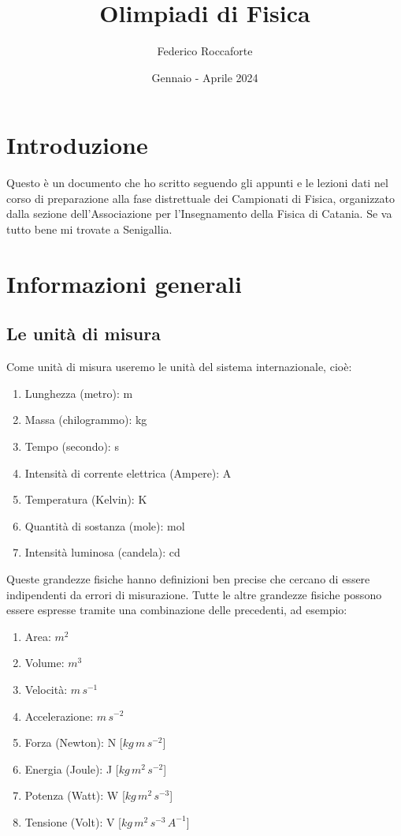 \documentclass{article}
\title{Olimpiadi di Fisica}
\author{Federico Roccaforte}
\date{Gennaio - Aprile 2024}
\begin{document}
\maketitle

\section*{Introduzione} 
Questo è un documento che ho scritto seguendo gli appunti e le lezioni dati nel corso di preparazione alla fase distrettuale dei Campionati di Fisica, organizzato dalla sezione dell'Associazione per l'Insegnamento della Fisica di Catania. Se va tutto bene mi trovate a Senigallia.

\tableofcontents

\section{Informazioni generali}
\subsection{Le unità di misura}
Come unità di misura useremo le unità del sistema internazionale, cioè:
\begin{enumerate}
    \item Lunghezza (metro):  m
    \item Massa (chilogrammo):  kg
    \item Tempo (secondo):  s
    \item Intensità di corrente elettrica (Ampere):  A
    \item Temperatura (Kelvin):  K
    \item Quantità di sostanza (mole):  mol
    \item Intensità luminosa (candela):  cd
\end{enumerate}
Queste grandezze fisiche hanno definizioni ben precise che cercano di essere indipendenti da errori di misurazione.
Tutte le altre grandezze fisiche possono essere espresse tramite una combinazione delle precedenti, ad esempio:
\begin{enumerate}
    \item Area:  $m^2$
    \item Volume: $m^3$
    \item Velocità: $m\,s^{-1}$
    \item Accelerazione: $m\,s^{-2}$
    \item Forza (Newton): N [$kg\,m\,s^{-2}$] 
    \item Energia (Joule): J [$kg\,m^2\,s^{-2}$] 
    \item Potenza (Watt): W [$kg\,m^2\,s^{-3}$] 
    \item Tensione (Volt): V [$kg\,m^2\,s^{-3}\,A^{-1}$] 
\end{enumerate}
\end{document}
